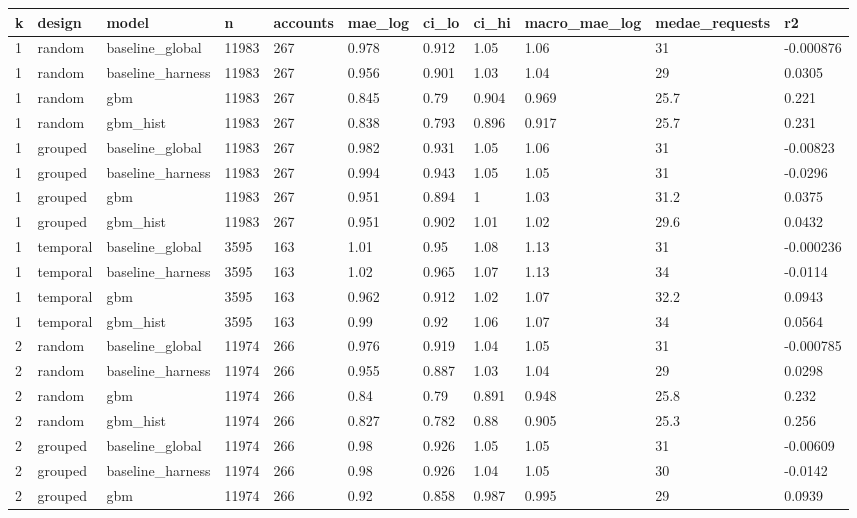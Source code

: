 \begin{tabular}{lllllllllll}
\toprule
k & design & model & n & accounts & mae\_log & ci\_lo & ci\_hi & macro\_mae\_log & medae\_requests & r2 \\
\midrule
1 & random & baseline\_global & 11983 & 267 & 0.978 & 0.912 & 1.05 & 1.06 & 31 & -0.000876 \\
1 & random & baseline\_harness & 11983 & 267 & 0.956 & 0.901 & 1.03 & 1.04 & 29 & 0.0305 \\
1 & random & gbm & 11983 & 267 & 0.845 & 0.79 & 0.904 & 0.969 & 25.7 & 0.221 \\
1 & random & gbm\_hist & 11983 & 267 & 0.838 & 0.793 & 0.896 & 0.917 & 25.7 & 0.231 \\
1 & grouped & baseline\_global & 11983 & 267 & 0.982 & 0.931 & 1.05 & 1.06 & 31 & -0.00823 \\
1 & grouped & baseline\_harness & 11983 & 267 & 0.994 & 0.943 & 1.05 & 1.05 & 31 & -0.0296 \\
1 & grouped & gbm & 11983 & 267 & 0.951 & 0.894 & 1 & 1.03 & 31.2 & 0.0375 \\
1 & grouped & gbm\_hist & 11983 & 267 & 0.951 & 0.902 & 1.01 & 1.02 & 29.6 & 0.0432 \\
1 & temporal & baseline\_global & 3595 & 163 & 1.01 & 0.95 & 1.08 & 1.13 & 31 & -0.000236 \\
1 & temporal & baseline\_harness & 3595 & 163 & 1.02 & 0.965 & 1.07 & 1.13 & 34 & -0.0114 \\
1 & temporal & gbm & 3595 & 163 & 0.962 & 0.912 & 1.02 & 1.07 & 32.2 & 0.0943 \\
1 & temporal & gbm\_hist & 3595 & 163 & 0.99 & 0.92 & 1.06 & 1.07 & 34 & 0.0564 \\
2 & random & baseline\_global & 11974 & 266 & 0.976 & 0.919 & 1.04 & 1.05 & 31 & -0.000785 \\
2 & random & baseline\_harness & 11974 & 266 & 0.955 & 0.887 & 1.03 & 1.04 & 29 & 0.0298 \\
2 & random & gbm & 11974 & 266 & 0.84 & 0.79 & 0.891 & 0.948 & 25.8 & 0.232 \\
2 & random & gbm\_hist & 11974 & 266 & 0.827 & 0.782 & 0.88 & 0.905 & 25.3 & 0.256 \\
2 & grouped & baseline\_global & 11974 & 266 & 0.98 & 0.926 & 1.05 & 1.05 & 31 & -0.00609 \\
2 & grouped & baseline\_harness & 11974 & 266 & 0.98 & 0.926 & 1.04 & 1.05 & 30 & -0.0142 \\
2 & grouped & gbm & 11974 & 266 & 0.92 & 0.858 & 0.987 & 0.995 & 29 & 0.0939 \\

\end{tabular}
